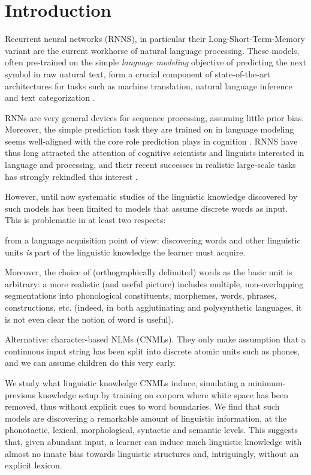 \section{Introduction}
\label{sec:introduction}

Recurrent neural networks (RNNS), in particular their Long-Short-Term-Memory
variant \cite[LSTMs,][]{Hochreiter:Schmidhuber:1997} are the current workhorse
of natural language processing. These models, often pre-trained on the
simple \emph{language modeling} objective of predicting the next
symbol in raw natural text, form a crucial component of
state-of-the-art architectures for tasks such as machine translation,
natural language inference and text categorization
\cite{Goldberg:2017}.

RNNs are very general devices for sequence processing, assuming little
prior bias. Moreover, the simple prediction task they are trained on
in language modeling seems well-aligned with the core role prediction
plays in cognition \cite[e.g.,][]{Bar:2007,Clark:2016}. RNNS have thus
long attracted the attention of cognitive scientists and linguists
interested in language and processing, and their recent successes in
realistic large-scale tasks has strongly rekindled this interest
\cite[see, e.g.,][and references there]{Frank:etal:2013,Lau:etal:2017,Kirov:Cotterell:2018,McCoy:etal:2018,Pater:2018}.

However, until now
systematic studies of the linguistic knowledge discovered by such
models has been limited to models that assume discrete words as
input. This is problematic in at least two
respects: \begin{inparaenum}[i)]
\item from a language
  acquisition point of view: discovering words and other linguistic
  units \emph{is} part of the linguistic knowledge the learner must
  acquire. 
\item Moreover, the choice of (orthographically delimited) words as
  the basic unit is arbitrary: a more realistic (and useful picture)
  includes multiple, non-overlapping segmentations into phonological
  constituents, morphemes, words, phrases, constructions,
  etc. (indeed, in both agglutinating and polysynthetic languages, it
  is not even clear the notion of word is useful).
\end{inparaenum}

Alternative: character-based NLMs (CNMLs). They only make assumption
that a continuous input string has been split into discrete atomic
units such as phones, and we can assume children do this very early.

We study what linguistic knowledge CNMLs induce, simulating a
minimum-previous knowledge setup by training on corpora where white
space has been removed, thus without explicit cues to word
boundaries. We find that such models are discovering a remarkable
amount of linguistic information, at the phonotactic, lexical,
morphological, syntactic and semantic levels. This suggests that,
given abundant input, a learner can induce much linguistic knowledge
with almost no innate bias towards linguistic structures and,
intriguingly, without an explicit lexicon.
